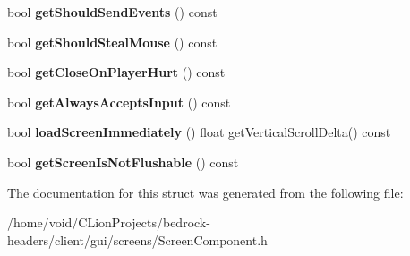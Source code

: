 \begin{DoxyCompactItemize}
bool {\bfseries get\+Should\+Send\+Events} () const
\item 
\mbox{\label{struct_screen_component_a9228e509d5057469c26ead24b6b74f18}} 
bool {\bfseries get\+Should\+Steal\+Mouse} () const
\item 
\mbox{\label{struct_screen_component_aecfd6e2810f6928573db2bd246bb236b}} 
bool {\bfseries get\+Close\+On\+Player\+Hurt} () const
\item 
\mbox{\label{struct_screen_component_a3cf07f303569cdb4fb236e823e39a967}} 
bool {\bfseries get\+Always\+Accepts\+Input} () const
\item 
\mbox{\label{struct_screen_component_a5867672ea9562cbc72ff6671a0ea692d}} 
bool {\bfseries load\+Screen\+Immediately} () float get\+Vertical\+Scroll\+Delta() const
\item 
\mbox{\label{struct_screen_component_a4e92b2c5a7f4d4a93ac4c9ee7fcf8008}} 
bool {\bfseries get\+Screen\+Is\+Not\+Flushable} () const
\end{DoxyCompactItemize}


The documentation for this struct was generated from the following file\+:\begin{DoxyCompactItemize}
\item 
/home/void/\+C\+Lion\+Projects/bedrock-\/headers/client/gui/screens/Screen\+Component.\+h\end{DoxyCompactItemize}
